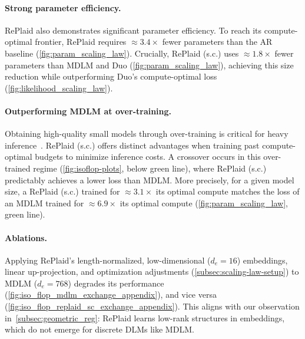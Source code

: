 \documentclass{article}
\begin{document}
\paragraph{Strong parameter efficiency.} RePlaid also demonstrates significant parameter efficiency. To reach its compute-optimal frontier, RePlaid requires $\approx3.4\times$ fewer parameters than the AR baseline (\cref{fig:param_scaling_law}). Crucially, RePlaid (s.c.) uses $\approx1.8\times$ fewer parameters than MDLM and Duo (\cref{fig:param_scaling_law}), achieving this size reduction while outperforming Duo's compute-optimal loss (\cref{fig:likelihood_scaling_law}). 
%

\paragraph{Outperforming MDLM at over-training.} Obtaining high-quality small models through over-training is critical for heavy inference~\citep{sardana2024beyond}. RePlaid (s.c.) offers distinct advantages when training past compute-optimal budgets to minimize inference costs. A crossover occurs in this over-trained regime (\cref{fig:isoflop-plots}, below green line), where RePlaid (s.c.) predictably achieves a lower loss than MDLM. More precisely, for a given model size, a RePlaid (s.c.) trained for $\approx 3.1\times$ its optimal compute matches the loss of an MDLM trained for $\approx 6.9\times$ its optimal compute (\cref{fig:param_scaling_law}, green line).

\paragraph{Ablations.} Applying RePlaid's length-normalized, low-dimensional ($d_e=16$) embeddings, linear up-projection, and optimization adjustments (\cref{subsec:scaling-law-setup}) to MDLM ($d_e=768$) degrades its performance (\cref{fig:iso_flop_mdlm_exchange_appendix}), and vice versa (\cref{fig:iso_flop_replaid_sc_exchange_appendix}). This aligns with our observation in~\cref{subsec:geometric_reg}: RePlaid learns low-rank structures in embeddings, which do not emerge for discrete DLMs like MDLM.

%
%
%
%
%

%

%
%
%

%
\end{document}
